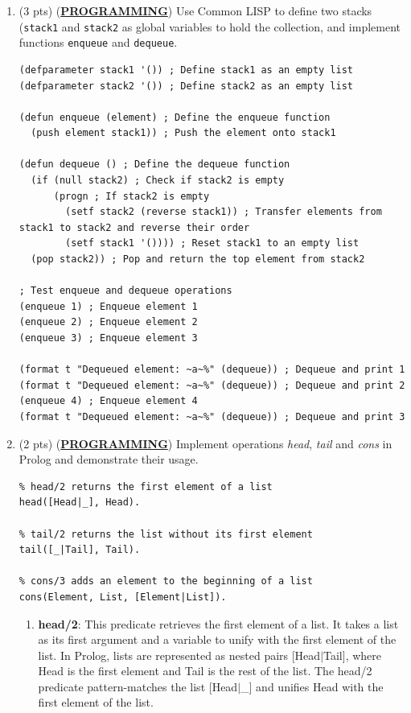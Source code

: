 \documentclass[12pt]{article}
\begin{document}
\begin{spacing}{1.5}
\begin{enumerate}
		\item (3 pts) (\textbf{\uline{PROGRAMMING}}) Use Common LISP to define two stacks (\texttt{stack1} and \texttt{stack2} as global variables to hold the collection, and implement functions \texttt{enqueue} and \texttt{dequeue}.
		      		      
		      \begin{lstlisting}
(defparameter stack1 '()) ; Define stack1 as an empty list
(defparameter stack2 '()) ; Define stack2 as an empty list

(defun enqueue (element) ; Define the enqueue function
  (push element stack1)) ; Push the element onto stack1

(defun dequeue () ; Define the dequeue function
  (if (null stack2) ; Check if stack2 is empty
      (progn ; If stack2 is empty
        (setf stack2 (reverse stack1)) ; Transfer elements from stack1 to stack2 and reverse their order
        (setf stack1 '()))) ; Reset stack1 to an empty list
  (pop stack2)) ; Pop and return the top element from stack2

; Test enqueue and dequeue operations
(enqueue 1) ; Enqueue element 1
(enqueue 2) ; Enqueue element 2
(enqueue 3) ; Enqueue element 3

(format t "Dequeued element: ~a~%" (dequeue)) ; Dequeue and print 1
(format t "Dequeued element: ~a~%" (dequeue)) ; Dequeue and print 2
(enqueue 4) ; Enqueue element 4
(format t "Dequeued element: ~a~%" (dequeue)) ; Dequeue and print 3
		      \end{lstlisting}
		      		              
		\item (2 pts) (\textbf{\uline{PROGRAMMING}}) Implement operations \textit{head}, \textit{tail} and \textit{cons} in Prolog and demonstrate their usage.
		      		      
		      \begin{lstlisting}
% head/2 returns the first element of a list
head([Head|_], Head).

% tail/2 returns the list without its first element
tail([_|Tail], Tail).

% cons/3 adds an element to the beginning of a list
cons(Element, List, [Element|List]).
		      \end{lstlisting}
		      
		      \begin{enumerate}
		      	\item \textbf{head/2}: This predicate retrieves the first element of a list. It takes a list as its first argument and a variable to unify with the first element of the list. In Prolog, lists are represented as nested pairs [Head$|$Tail], where Head is the first element and Tail is the rest of the list. The head/2 predicate pattern-matches the list [Head$|$\_] and unifies Head with the first element of the list.
		      	      

\end{enumerate}
\end{enumerate}
\end{spacing}
\end{document}
